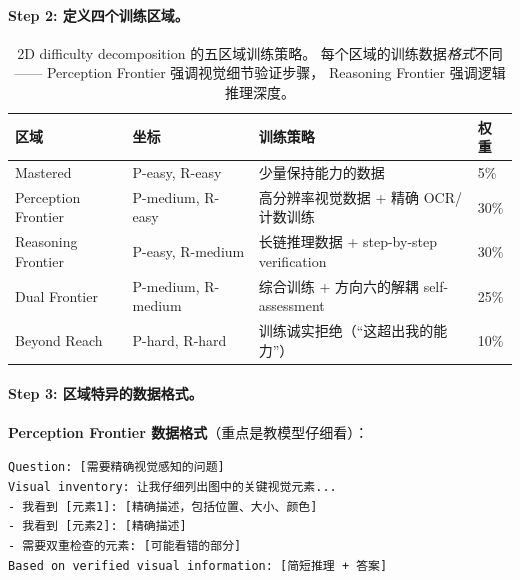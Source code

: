 \documentclass[12pt,a4paper]{article}
\begin{document}
\paragraph{Step 2: 定义四个训练区域。}

\begin{table}[h]
\centering
\small
\begin{tabular}{p{3.5cm}p{2.5cm}p{5cm}l}
\toprule
\textbf{区域} & \textbf{坐标} & \textbf{训练策略} & \textbf{权重} \\
\midrule
Mastered
  & P-easy, R-easy
  & 少量保持能力的数据
  & 5\% \\
Perception Frontier
  & P-medium, R-easy
  & 高分辨率视觉数据 + 精确 OCR/计数训练
  & 30\% \\
Reasoning Frontier
  & P-easy, R-medium
  & 长链推理数据 + step-by-step verification
  & 30\% \\
Dual Frontier
  & P-medium, R-medium
  & 综合训练 + 方向六的解耦 self-assessment
  & 25\% \\
Beyond Reach
  & P-hard, R-hard
  & 训练诚实拒绝（``这超出我的能力''）
  & 10\% \\
\bottomrule
\end{tabular}
\caption{2D difficulty decomposition 的五区域训练策略。
每个区域的训练数据\textit{格式}不同——
Perception Frontier 强调视觉细节验证步骤，
Reasoning Frontier 强调逻辑推理深度。}
\label{tab:2d-regions}
\end{table}

\paragraph{Step 3: 区域特异的数据格式。}

\textbf{Perception Frontier 数据格式}（重点是教模型仔细看）：
\begin{tcolorbox}[colback=gray!5,colframe=gray!50,boxrule=0.3pt,left=4pt,right=4pt]
\small
\texttt{Question: [需要精确视觉感知的问题]}\\[2pt]
\texttt{Visual inventory: 让我仔细列出图中的关键视觉元素...}\\
\texttt{- 我看到 [元素1]: [精确描述，包括位置、大小、颜色]}\\
\texttt{- 我看到 [元素2]: [精确描述]}\\
\texttt{- 需要双重检查的元素: [可能看错的部分]}\\[2pt]
\texttt{Based on verified visual information: [简短推理 + 答案]}
\end{tcolorbox}
\end{document}
